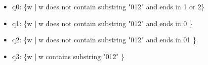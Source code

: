 \documentclass[11pt,twoside]{article}
\begin{document}
\begin{enumerate}
\begin{tikzpicture}[->,>=stealth',shorten >=1pt,auto,node distance=2.8cm,semithick]
    \end{tikzpicture}


    \begin{itemize}
    \item[] q0: \{w | w does not contain substring "012" and ends in 1 or 2\}
    \item[] q1: \{w | w does not contain substring "012" and ends in 0 \}
    \item[] q2: \{w | w does not contain substring "012" and ends in 01  \}
    \item[] q3: \{w | w contains substring "012"  \}
    \end{itemize}
    \\ \ \\




\end{enumerate}
\end{document}
